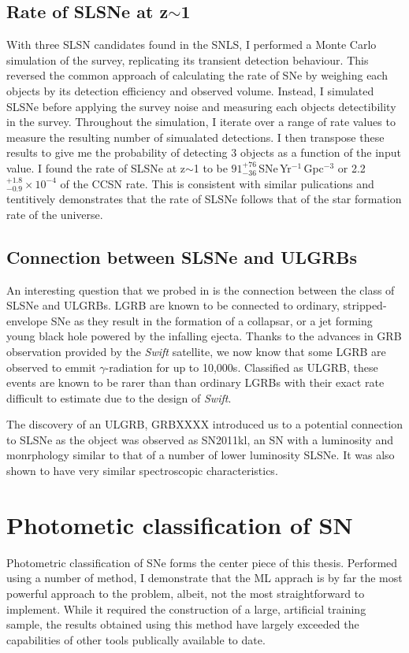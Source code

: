 \subsection{Rate of SLSNe at z$\sim$1}
With three SLSN candidates found in the SNLS, I performed a Monte Carlo simulation of the survey, replicating its transient detection behaviour. This reversed the common approach of calculating the rate of SNe by weighing each objects by its detection efficiency and observed volume. Instead, I simulated SLSNe before applying the survey noise and measuring each objects detectibility in the survey. Throughout the simulation, I iterate over a range of rate values to measure the resulting number of simualated detections. I then transpose these results to give me the probability of detecting 3 objects as a function of the input value. I found the rate of SLSNe at z$\sim$1 to be $91^{+76}_{-36}$\,SNe\,Yr$^{-1}$\,Gpc$^{-3}$ or 2.2$^{+1.8}_{-0.9}\times10^{-4}$ of the CCSN rate. This is consistent with similar pulications and tentitively demonstrates that the rate of SLSNe follows that of the star formation rate of the universe.

\subsection{Connection between SLSNe and ULGRBs}
An interesting question that we probed in \citet{Prajs2016} is the connection between the class of SLSNe and ULGRBs. LGRB are known to be connected to ordinary, stripped-envelope SNe as they result in the formation of a collapsar, or a jet forming young black hole powered by the infalling ejecta. Thanks to the advances in GRB observation provided by the \textit{Swift} satellite, we now know that some LGRB are observed to emmit $\gamma$-radiation for up to 10,000s. Classified as ULGRB, these events are known to be rarer than than ordinary LGRBs with their exact rate difficult to estimate due to the design of \textit{Swift}.

The discovery of an ULGRB, GRBXXXX introduced us to a potential connection to SLSNe as the object was observed as SN2011kl, an SN with a luminosity and monrphology similar to that of a number of lower luminosity SLSNe. It was also shown to have very similar spectroscopic characteristics.

\section{Photometic classification of SN}
Photometric classification of SNe forms the center piece of this thesis. Performed using a number of method, I demonstrate that the ML apprach is by far the most powerful approach to the problem, albeit, not the most straightforward to implement. While it required the construction of a large, artificial training sample, the results obtained using this method have largely exceeded the capabilities of other tools publically available to date.

